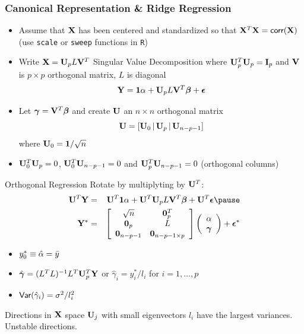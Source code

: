 \documentclass[]{beamer}\usepackage[]{graphicx}\usepackage[]{color}
\begin{document}
\begin{frame}
  \frametitle{Canonical Representation \& Ridge Regression}


  \begin{itemize}
\item  Assume that $\mathbf{X}$ has been centered and standardized so that $\mathbf{X}^T\mathbf{X}
  = \textsf{corr}(\mathbf{X})$ \pause  (use {\tt scale} or {\tt sweep} functions in {\tt R}) \pause
  \item Write $\mathbf{X} = \mathbf{U}_p L \mathbf{V}^T$ Singular Value Decomposition \pause where
    $\mathbf{U}_p^T\mathbf{U}_p = \mathbf{I}_p$ and $\mathbf{V}$ is $p \times p$ orthogonal matrix,
    $L$ is diagonal \pause
  $$ \mathbf{Y} = \mathbf{1} \alpha +  \mathbf{U}_p L \mathbf{V}^T \boldsymbol{\beta} + \boldsymbol{\epsilon} $$ \pause
  \item  Let $\boldsymbol{\gamma} =  \mathbf{V}^T \boldsymbol{\beta}$ and create
   $\mathbf{U}$   an $n \times n$  orthogonal matrix \pause
  $$\mathbf{U} = [\mathbf{U}_0 \, | \, \mathbf{U}_p \,| \,\mathbf{U}_{n-p-1}]$$
  where $\mathbf{U}_0 = \mathbf{1}/\sqrt{n}$  \pause
  \item $\mathbf{U}_0^T\mathbf{U}_p = 0$, $\mathbf{U}^T_0 \mathbf{U}_{n-p-1} = 0$ and  $\mathbf{U}_p^T\mathbf{U}_{n - p -1} = 0$ (orthogonal columns)
  \end{itemize}
\end{frame}
  \begin{frame} {Orthogonal Regression}
Rotate by multiplyting by $\mathbf{U}^T$:
  \begin{eqnarray*}
    \U^T \Y & = & \U^T \one \alpha + \U^T \U_p L \V^T \b + \U^T \eps \pause \\
    \Y^*
   &=& \left[
  \begin{array}{cc}
  \sqrt{n} & \zero_p^T\\ \zero_p & L \\  \zero_{n-p -1} & \zero_{n - p - 1  \times p}
  \end{array}
 \right]
\left(    \begin{array}{c}
      \alpha \\
  \g
    \end{array} \right)
+  \eps^*
  \end{eqnarray*} \pause


  \begin{itemize}
  \item   $y^*_0 \equiv \hat{\alpha} = \bar{y}$ \pause
\item $\hat{\boldsymbol{\gamma}} =( L^TL)^{-1} L^T \mathbf{U}^T_p\mathbf{Y}$ or $\hat{\gamma}_i = y^*_i/l_i$ for
  $i = 1, \ldots, p$ \pause
\item  $\textsf{Var}(\hat{\gamma}_i) = \sigma^2/l_i^2$
  \end{itemize}
Directions in $\mathbf{X}$ space $\mathbf{U}_j$ with small eigenvectors $l_i$ have
the largest variances.  Unstable directions.
\end{frame}
\end{document}

